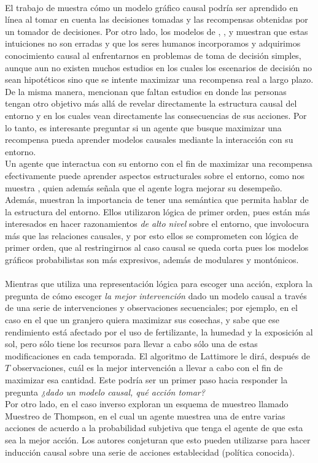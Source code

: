 \documentclass[11pt]{article}
\theoremstyle{plain}
\begin{document}
\\
El trabajo de \cite{wellen2012learning} muestra cómo un modelo gráfico causal podría ser aprendido en línea al tomar en cuenta las decisiones tomadas y las recompensas obtenidas por un tomador de decisiones. Por otro lado, los modelos de \cite{sloman2006causal}, \cite{meder2008inferring}, \cite{hagmayer2009decision} y \cite{hagmayer2013repeated} muestran que estas intuiciones no son erradas y que los seres humanos incorporamos y adquirimos conocimiento causal al enfrentarnos en problemas de toma de decisión simples, aunque aun no existen muchos estudios en los cuales los escenarios de decisión no sean hipotéticos sino que se intente maximizar una recompensa real a largo plazo. De la misma manera, \cite{hagmayer2013repeated} mencionan que faltan estudios en donde las personas tengan otro objetivo más allá de revelar directamente la estructura causal del entorno y en los cuales vean directamente las consecuencias de sus acciones. Por lo tanto, es interesante preguntar si un agente que busque maximizar una recompensa pueda aprender modelos causales mediante la interacción con su entorno.
\\
Un agente que interactua con su entorno con el fin de maximizar una recompensa efectivamente puede aprender aspectos estructurales sobre el entorno, como nos muestra \cite{garnelo2016towards}, quien además señala que el agente logra mejorar su desempeño. Además, muestran la importancia de tener una semántica que permita hablar de la estructura del entorno. Ellos utilizaron lógica de primer orden, pues están más interesados en hacer razonamientos \textit{de alto nivel} sobre el entorno, que involocura más que las relaciones causales, y por esto ellos se comprometen con lógica de primer orden, que al restringirnos al caso causal se queda corta pues los modelos gráficos probabilistas son más expresivos, además de modulares y montónicos.\\
\\
Mientras que \cite{garnelo2016towards} utiliza una representación lógica para escoger una acción, \cite{lattimoreNIPS2016} explora la pregunta de cómo escoger \textit{la mejor intervención} dado un modelo causal a través de una serie de intervenciones y observaciones secuenciales; por ejemplo, en el caso en el que un granjero quiera maximizar sus cosechas, y sabe que ese rendimiento está afectado por el uso de fertilizante, la humedad y la exposición al sol, pero sólo tiene los recursos para llevar a cabo sólo una de estas modificaciones en cada temporada. El algoritmo de Lattimore le dirá, después de $T$ observaciones, cuál es la mejor intervención a llevar a cabo con el fin de maximizar esa cantidad. Este podría ser un primer paso hacia responder la pregunta \textit{¿dado un modelo causal, qué acción tomar?}
\\
Por otro lado, en el caso inverso \cite{ortega2014generalized} exploran un esquema de muestreo llamado Muestreo de Thompson, en el cual un agente muestrea una de entre varias acciones de acuerdo a la probabilidad subjetiva que tenga el agente de que esta sea la mejor acción. Los autores conjeturan que esto pueden utilizarse para hacer inducción causal sobre una serie de acciones establecidad (política conocida).
\end{document}
